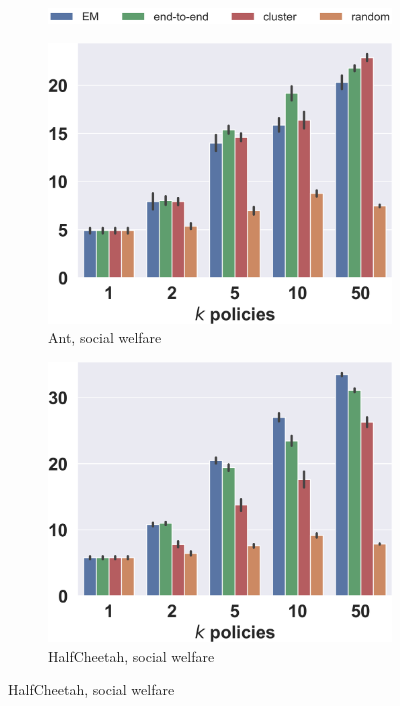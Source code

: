 \documentclass[letterpaper]{article} %
\begin{document}
\begin{figure}[t]
\begin{center}

    \centering
    \begin{subfigure}{.55\linewidth}
        \centering
        \includegraphics[width=\linewidth]{pics/legend_bars.png}
    \end{subfigure}

    \begin{subfigure}{0.245\textwidth}
        \centering
        \caption{Ant, social welfare}
        \includegraphics[width=\linewidth]{pics/Ant-v4_bars.png}
    \end{subfigure}%
    \hfill%
    \begin{subfigure}{0.245\textwidth}
        \centering
        \caption{HalfCheetah, social welfare}
        \includegraphics[width=\linewidth]{pics/HalfCheetah-v4_bars.png}

\end{subfigure}
\end{center}
\end{figure}
\end{document}
